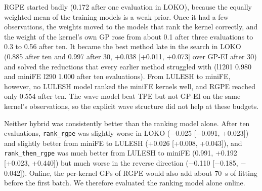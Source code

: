 \documentclass[10pt]{article}
\newcommand{\code}[1]{\texttt{#1}}
\begin{document}
RGPE started badly (0.172 after one evaluation in LOKO), because the equally
weighted mean of the training models is a weak prior. Once it had a few
observations, the weights moved to the models that rank the kernel correctly,
and the weight of the kernel's own GP rose from about 0.1 after three
evaluations to 0.3 to 0.56 after ten. It became the best method late in the
search in LOKO (0.885 after ten and 0.997 after 30, +0.038 [+0.011, +0.073]
over GP-EI after 30) and solved the reductions that every earlier method
struggled with (l1201 0.980 and miniFE l290 1.000 after ten evaluations).
From LULESH to miniFE, however, no LULESH model ranked the miniFE kernels
well, and RGPE reached only 0.554 after ten. The wave model beat TPE but not
GP-EI on the same kernel's observations, so the explicit wave structure did
not help at these budgets.

Neither hybrid was consistently better than the ranking model alone. After ten
evaluations, \code{rank\_rgpe} was slightly worse in LOKO ($-$0.025 [$-$0.091,
+0.023]) and slightly better from miniFE to LULESH (+0.026 [+0.008, +0.043]),
and \code{rank\_then\_rgpe} was much better from LULESH to miniFE (0.991,
+0.192 [+0.023, +0.440]) but much worse in the reverse direction ($-$0.110
[$-$0.185, $-$0.042]). Online, the per-kernel GPs of RGPE would also add about
70~s of fitting before the first batch. We therefore evaluated the ranking
model alone online.
\end{document}

